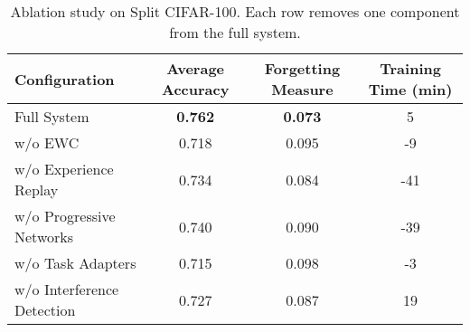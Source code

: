 
\begin{table}[ht]
\centering
\caption{Ablation study on Split CIFAR-100. Each row removes one component from the full system.}
\label{tab:ablation}
\begin{tabular}{lccc}
\toprule
Configuration & Average Accuracy & Forgetting Measure & Training Time (min) \\
\midrule
Full System & \textbf{0.762} & \textbf{0.073} & 5 \\
w/o EWC & 0.718 & 0.095 & -9 \\
w/o Experience Replay & 0.734 & 0.084 & -41 \\
w/o Progressive Networks & 0.740 & 0.090 & -39 \\
w/o Task Adapters & 0.715 & 0.098 & -3 \\
w/o Interference Detection & 0.727 & 0.087 & 19 \\
\bottomrule
\end{tabular}
\end{table}
